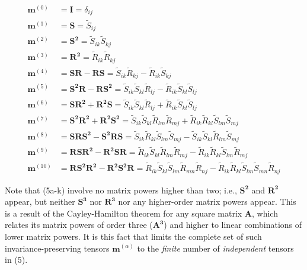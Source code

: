 %
\begin{subequations}
\begin{align}
	\label{E:22}
		\mathbf{m}^{(0)} &= \mathbf{I} = \delta_{ij} \\
		\mathbf{m}^{(1)} &= \mathbf{S} = \widetilde{S}_{ij} \\
		\mathbf{m}^{(2)} &= \mathbf{S^2} = \widetilde{S}_{ik} \widetilde{S}_{kj} \\
		\mathbf{m}^{(3)} &= \mathbf{R^2} = \widetilde{R}_{ik} \widetilde{R}_{kj} \\
		\mathbf{m}^{(4)} &= \mathbf{SR - RS} = \widetilde{S}_{ik} \widetilde{R}_{kj} 
		- \widetilde{R}_{ik} \widetilde{S}_{kj} \\
		\mathbf{m}^{(5)} &= \mathbf{S^2R - RS^2} 
		= 	\widetilde{S}_{ik} \widetilde{S}_{kl} \widetilde{R}_{lj} 
		-   \widetilde{R}_{ik} \widetilde{S}_{kl} \widetilde{S}_{lj} \\
		\mathbf{m}^{(6)} &= \mathbf{SR^2 + R^2S} 
		= 	\widetilde{S}_{ik} \widetilde{S}_{kl} \widetilde{R}_{lj} 
		+   \widetilde{R}_{ik} \widetilde{S}_{kl} \widetilde{S}_{lj} \\
		\mathbf{m}^{(7)} &= \mathbf{S^2R^2 + R^2S^2} 
		= 	\widetilde{S}_{ik} \widetilde{S}_{kl} \widetilde{R}_{lm} \widetilde{R}_{mj}  
		+   \widetilde{R}_{ik} \widetilde{R}_{kl} \widetilde{S}_{lm} \widetilde{S}_{mj} \\
		\mathbf{m}^{(8)} &= \mathbf{SRS^2 - S^2RS} 
		= 	\widetilde{S}_{ik} \widetilde{R}_{kl} \widetilde{S}_{lm} \widetilde{S}_{mj}  
		-   \widetilde{S}_{ik} \widetilde{S}_{kl} \widetilde{R}_{lm} \widetilde{S}_{mj} \\
		\mathbf{m}^{(9)} &= \mathbf{RSR^2 - R^2SR} 
		= 	\widetilde{R}_{ik} \widetilde{S}_{kl} \widetilde{R}_{lm} \widetilde{R}_{mj}  
		-   \widetilde{R}_{ik} \widetilde{R}_{kl} \widetilde{S}_{lm} \widetilde{R}_{mj} \\
		\mathbf{m}^{(10)} &= \mathbf{RS^2R^2 - R^2S^2R} 
		= 	\widetilde{R}_{ik} \widetilde{S}_{kl} \widetilde{S}_{lm} \widetilde{R}_{mn} \widetilde{R}_{nj} 
		-   \widetilde{R}_{ik} \widetilde{R}_{kl} \widetilde{S}_{lm} \widetilde{S}_{mn} \widetilde{R}_{nj}
\end{align}
\end{subequations}
%
%      
	  	
Note that (5a-k) involve no matrix powers higher than two; i.e., $\mathbf{S^2}$ and $\mathbf{R^2}$  appear, but neither $\mathbf{S^3}$  nor $\mathbf{R^3}$  nor any higher-order matrix powers appear. This is a result of the Cayley-Hamilton theorem for any square matrix $\mathbf{A}$, which relates its matrix powers of order three ($\mathbf{A^3}$) and higher to linear combinations of lower matrix powers. It is this fact that limits the complete set of such invariance-preserving tensors  $\mathbf{m}^{(\alpha)}$  to the \textit{finite} number of \textit{independent} tensors in (5).

